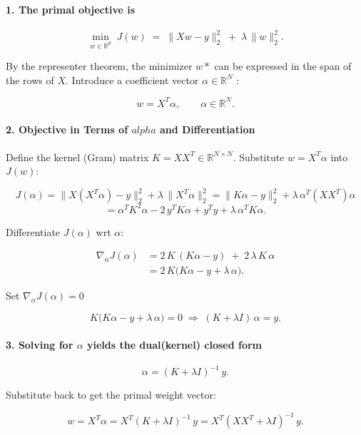 \documentclass{article}
\begin{document}
\paragraph{1. The primal objective is}
\[
\min_{w\in\mathbb{R}^d}
\;J(w)
\;=\;\|Xw - y\|_2^2 \;+\;\lambda\,\|w\|_2^2.
\]

By the representer theorem, the minimizer \(w*\) can be expressed in the span of the rows of \(X\). Introduce a coefficient vector \(\alpha \in \mathbb{R}^N\) :

\[
w = X^T \alpha,
\qquad
\alpha\in\mathbb{R}^N.
\]


\paragraph{2. Objective in Terms of \(alpha\) and Differentiation}

Define the kernel (Gram) matrix \(K = X X^{T} \in \mathbb{R}^{N \times N}\).
Substitute \(w=X^{T} \alpha \) into \(J(w)\):

\[
J(\alpha) 
= \| X (X^{T} \alpha) - y \|_2^2 
+ \lambda \, \| X^{T} \alpha \|_2^2
= \| K \alpha - y \|_2^2 
+ \lambda \, \alpha^{T} (X X^{T}) \alpha
\]
\[
= \alpha^{T} K^2 \alpha 
- 2 \, y^{T} K \alpha 
+ y^{T} y 
+ \lambda \, \alpha^{T} K \alpha.
\]

Differentiate \(J(\alpha)\) wrt \(\alpha\):


\[
\begin{aligned}
\nabla_\alpha J(\alpha)
&= 2\,K\,(K\alpha - y) \;+\;2\,\lambda\,K\,\alpha \\
&= 2\,K\bigl(K\alpha - y + \lambda\,\alpha\bigr).
\end{aligned}
\]


Set \(\nabla_\alpha J(\alpha) = 0\)

\[
K\bigl(K\alpha - y + \lambda\,\alpha\bigr)=0
\;\Longrightarrow\;
(K + \lambda I)\,\alpha = y.
\]

\paragraph{3. Solving for \(\alpha\) yields the dual(kernel) closed form}

\[
\alpha 
= (K + \lambda I)^{-1}\,y.
\]

Substitute back to get the primal weight vector:


\[
w 
= X^T \alpha
= X^T (K + \lambda I)^{-1}\,y
= X^T (X X^T + \lambda I)^{-1}\,y.
\]
\end{document}
